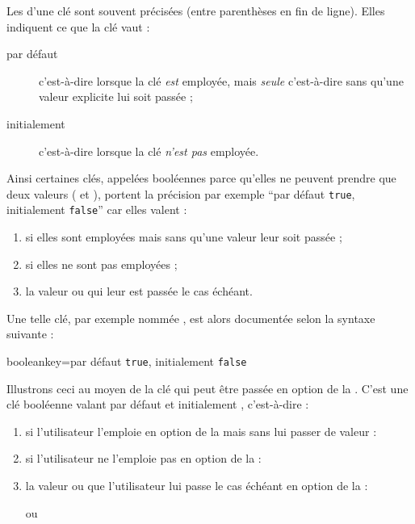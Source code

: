 Les  d'une clé sont souvent précisées
(entre parenthèses en fin de ligne). Elles indiquent ce que la clé vaut :
\begin{description}
\item[par défaut] c'est-à-dire lorsque la clé \emph{est} employée, mais
  \emph{seule} c'est-à-dire sans qu'une valeur explicite lui soit passée ;
\item[initialement] c'est-à-dire lorsque la clé \emph{n'est pas} employée.
\end{description}
Ainsi certaines clés, appelées booléennes parce qu'elles ne peuvent prendre que
deux valeurs ( et ), portent la précision par
exemple \enquote{par défaut \lstinline|true|, initialement \lstinline|false|}
car elles valent :
\begin{enumerate}
\item {} si elles sont employées mais sans qu'une valeur leur
  soit passée ;
\item {} si elles ne sont pas employées ;
\item la valeur  ou  qui leur est passée le
  cas échéant.
\end{enumerate}
Une telle clé, par exemple nommée , est alors documentée selon la
syntaxe suivante :
\begin{docKey*}{booleankey}{=\textbar{}}{par
    défaut \lstinline|true|, initialement \lstinline|false|}
\end{docKey*}

Illustrons ceci au moyen de la clé  qui peut être passée en
option de la \yatcl. C'est une clé booléenne valant par défaut 
et initialement , c'est-à-dire :
\begin{enumerate}
\item {} si l'utilisateur l'emploie en option de la \yatcl mais
  sans lui passer de valeur :
\item {} si l'utilisateur ne l'emploie pas en option de la \yatcl :
\item la valeur  ou  que l'utilisateur lui
  passe le cas échéant en option de la \yatcl :
ou
\end{enumerate}

